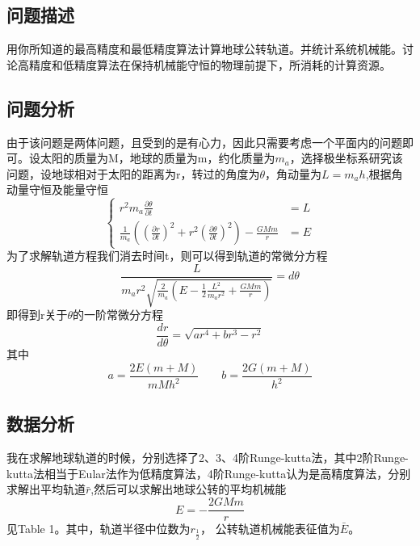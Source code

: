 \documentclass[twoside,twocolumn]{article}
\begin{document}
\begin{CJK*}{UTF8}{gkai}
\subsection{问题描述}
用你所知道的最高精度和最低精度算法计算地球公转轨道。并统计系统机械能。讨论高精度和低精度算法在保持机械能守恒的物理前提下，所消耗的计算资源。
\subsection{问题分析}
由于该问题是两体问题，且受到的是有心力，因此只需要考虑一个平面内的问题即可。设太阳的质量为M，地球的质量为m，约化质量为$m_{a}$，选择极坐标系研究该问题，设地球相对于太阳的距离为r，转过的角度为$\theta$，角动量为$L=m_{a}h$,根据角动量守恒及能量守恒
\begin{equation*}
	\left\{
	\begin{aligned}
		r^{2}m_{a}\frac{\partial \theta}{\partial t}&=L\\
		\frac{1}{m_{a}}(\left(\frac{\partial r}{\partial t}\right)^{2}+r^{2}\left(\frac{\partial \theta}{\partial t}\right)^{2})-\frac{GMm}{r}&=E
	\end{aligned}
	\right.
\end{equation*}
为了求解轨道方程我们消去时间t，则可以得到轨道的常微分方程
\begin{equation*}
	\frac{L}{m_{a}r^{2}\sqrt{\frac{2}{m_{a}}(E-\frac{1}{2}\frac{L^{2}}{m_{a}r^{2}}+\frac{GMm}{r})}}=d\theta
\end{equation*}
即得到r关于$\theta$的一阶常微分方程
\begin{equation*}
	\frac{dr}{d\theta}=\sqrt{ar^{4}+br^{3}-r^{2}}
\end{equation*}
其中
\begin{equation*}
	a=\frac{2E(m+M)}{mMh^{2}}\qquad b=\frac{2G(m+M)}{h^{2}}
\end{equation*}
\subsection{数据分析}
我在求解地球轨道的时候，分别选择了2、3、4阶Runge-kutta法，其中2阶Runge-kutta法相当于Eular法作为低精度算法，4阶Runge-kutta认为是高精度算法，分别求解出平均轨道$\bar{r}$,然后可以求解出地球公转的平均机械能
\begin{equation*}
	E=-\frac{2GMm}{r}
\end{equation*}
见Table 1。其中，轨道半径中位数为$r_{\frac{1}{2}}$，
公转轨道机械能表征值为$\bar{E}$。


\end{CJK*}
\end{document}
